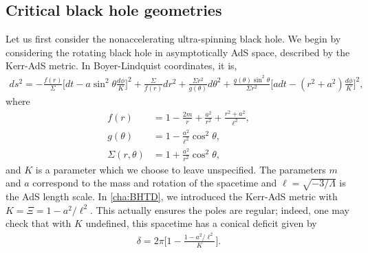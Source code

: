 \documentclass[
twoside,
openright,
frontopenright,
]{dmathesis}
\newcommand{\nn}{\nonumber}
\begin{document}

\subsection{Critical black hole geometries}

Let us first consider the nonaccelerating ultra-spinning black hole. We begin by
considering the rotating black hole in asymptotically AdS space, described by
the Kerr-AdS metric. In Boyer-Lindquist coordinates, it is,
\begin{align} \label{eq:kerrAdS}
ds^2 = -\frac{f(r)}{\Sigma}\Big[dt-a\sin^2\theta \frac{d\phi}{K} \Big]^2 +
  \frac{\Sigma}{f(r)}dr^2 + \frac{\Sigma r^2}{g(\theta)}d\theta^2 +
  \frac{g(\theta) \sin^2\theta}{\Sigma r^2} \Big[adt-(r^2+a^2)
  \frac{d\phi}{K}\Big]^2, 
\end{align}
where
\begin{align}
f(r)&= 1-\frac{2 m}{r}+\frac{a^2}{r^2}+\frac{r^2+a^2}{\ell^2},\nn\\
g(\theta)&=1 - \frac{a^2}{\ell^2} \cos^2\theta, \nn\\
\Sigma(r, \theta) &= 1 + \frac{a^2}{r^2} \cos^2\theta,
\end{align}
and $K$ is a parameter which we choose to leave unspecified. The parameters $m$
and $a$ correspond to the mass and rotation of the spacetime and
$\ell = \sqrt{-3/\Lambda}$ is the AdS length scale. In \cref{cha:BHTD}, we
introduced the Kerr-AdS metric with $K = \Xi = 1-a^2/\ell^2$. This actually ensures
the poles are regular; indeed, one may check that with $K$ undefined, this
spacetime has a conical deficit given by
\begin{align}\label{eq:deficit-al}
\delta = 2\pi \bigg[1-\frac{1-a^{2}/\ell^{2}}{K}\bigg].
\end{align}
\end{document}
